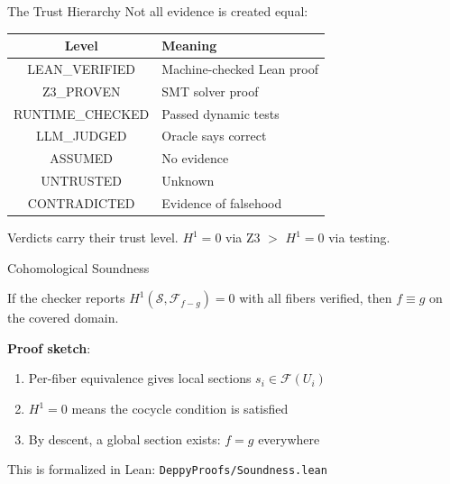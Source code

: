 \documentclass[aspectratio=169,11pt]{beamer}
\newcommand{\site}{\mathcal{S}}
\begin{document}
\begin{frame}{The Trust Hierarchy}
Not all evidence is created equal:

\begin{center}
\begin{tabular}{cl}
\toprule
\textbf{Level} & \textbf{Meaning} \\
\midrule
\color{green!60!black} LEAN\_VERIFIED & Machine-checked Lean proof \\
\color{green!60!black} Z3\_PROVEN & SMT solver proof \\
\color{yellow!60!black} RUNTIME\_CHECKED & Passed dynamic tests \\
\color{orange} LLM\_JUDGED & Oracle says correct \\
\color{red} ASSUMED & No evidence \\
\color{red!80!black} UNTRUSTED & Unknown \\
\color{red!50!black} CONTRADICTED & Evidence of falsehood \\
\bottomrule
\end{tabular}
\end{center}

\vspace{0.3em}
Verdicts carry their trust level. $H^1 = 0$ via Z3 $>$ $H^1 = 0$ via testing.
\end{frame}

\begin{frame}{Cohomological Soundness}
\begin{theorem}[Soundness]
If the checker reports $H^1(\site, \mathcal{F}_{f-g}) = 0$ with all fibers verified, then $f \equiv g$ on the covered domain.
\end{theorem}

\vspace{0.5em}
\textbf{Proof sketch}:
\begin{enumerate}
\item Per-fiber equivalence gives local sections $s_i \in \mathcal{F}(U_i)$
\item $H^1 = 0$ means the cocycle condition is satisfied
\item By descent, a global section exists: $f = g$ everywhere
\end{enumerate}

\vspace{0.5em}
This is formalized in Lean: \texttt{DeppyProofs/Soundness.lean}
\end{frame}
\end{document}
